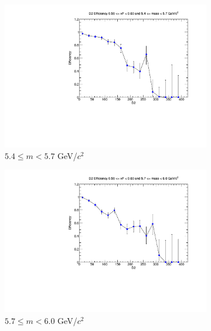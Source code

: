\documentclass[11pt]{article}
\begin{document}
\begin{figure}[p]
\begin{subfigure}[b]{0.32\textwidth}
        \includegraphics[width=\textwidth]{./kTrackerEfficiencyPlots/D2_Efficiency_xF11_mass4.pdf}
        \caption{$5.4 \leq m < 5.7$ GeV/$c^2$}
    \end{subfigure}\hfill
    \begin{subfigure}[b]{0.32\textwidth}
        \centering
        \includegraphics[width=\textwidth]{./kTrackerEfficiencyPlots/D2_Efficiency_xF11_mass5.pdf}
        \caption{$5.7 \leq m < 6.0$ GeV/$c^2$}
    \end{subfigure}\vspace{0.5cm}
    \begin{subfigure}[b]{0.32\textwidth}
        \centering

\end{subfigure}
\end{figure}
\end{document}
